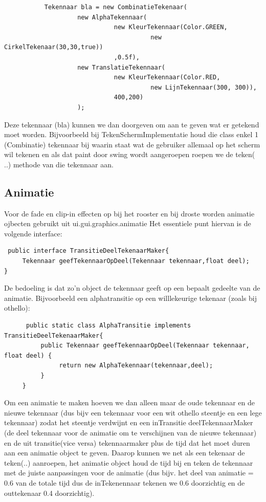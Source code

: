 \documentclass[a4paper,10pt]{article}
\begin{document}
\begin{verbatim}
           Tekennaar bla = new CombinatieTekenaar(
                    new AlphaTekennaar(
                              new KleurTekennaar(Color.GREEN, 
                                        new CirkelTekenaar(30,30,true))
                              ,0.5f),
                    new TranslatieTekennaar(
                              new KleurTekennaar(Color.RED,
                                        new LijnTekennaar(300, 300)), 
                              400,200)
                    );
\end{verbatim}

Deze tekennaar (bla) kunnen we dan doorgeven om aan te geven wat er getekend moet worden. Bijvoorbeeld bij TekenSchermImplementatie houd die class enkel 1 (Combinatie) tekennaar bij waarin staat wat de gebruiker allemaal op het scherm wil tekenen en als dat paint door swing wordt aangeroepen roepen we de teken( ..) methode van die tekennaar aan.

\subsection{Animatie}

Voor de fade en clip-in effecten op bij het rooster en bij droste worden animatie ojbecten gebruikt uit ui.gui.graphics.animatie  Het essentiele punt hiervan is de volgende interface:

\begin{verbatim}
 public interface TransitieDeelTekenaarMaker{
     Tekennaar geefTekennaarOpDeel(Tekennaar tekennaar,float deel);
}
\end{verbatim}

De bedoeling is dat zo'n object de tekennaar geeft op een bepaalt gedeelte van de animatie. Bijvoorbeeld een alphatransitie op een willlekeurige tekenaar (zoals bij othello):

\begin{verbatim}
      public static class AlphaTransitie implements TransitieDeelTekenaarMaker{
          public Tekennaar geefTekennaarOpDeel(Tekennaar tekennaar, float deel) {
               return new AlphaTekennaar(tekennaar,deel);
          }
     }
\end{verbatim}

Om een animatie te maken hoeven we dan alleen maar de oude tekennaar en de nieuwe tekennaar (dus bijv een tekennaar voor een wit othello steentje en een lege tekennaar) zodat het steentje verdwijnt en een inTransitie deelTekennaarMaker (de deel tekennaar voor de animatie om te verschijnen van de nieuwe tekennaar) en de uit transitie(vice versa) tekennaarmaker plus de tijd dat het moet duren aan een animatie object te geven. Daarop kunnen we net als een tekenaar de teken(..) aanroepen, het animatie object houd de tijd bij en teken de tekennaar met de juiste aanpassingen voor de animatie (dus bijv. het deel van animatie = 0.6 van de totale tijd dus  de inTekenennaar tekenen we 0.6 doorzichtig en de outtekenaar 0.4 doorzichtig).\\
\end{document}
